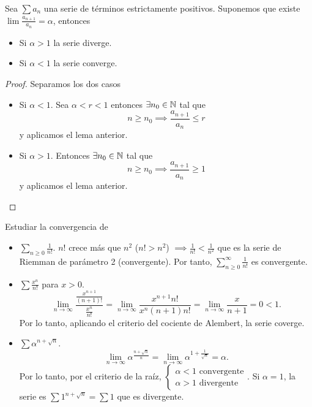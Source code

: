 \begin{prop}
    Sea $\sum a_n$ una serie de términos estrictamente positivos. Suponemos que existe
    $\lim \frac{a_{n+1}}{a_n} = \alpha$, entonces
    \begin{itemize}
        \item Si $\alpha > 1$ la serie diverge.
        \item Si $\alpha < 1$ la serie converge.
    \end{itemize}
\end{prop}

\begin{proof}
    Separamos los dos casos
    \begin{itemize}
        \item Si $\alpha < 1$. Sea $\alpha < r < 1$ entonces $\exists n_0 \in \mathbb{N}$
        tal que
        \[
            n \geq n_0 \implies \frac{a_{n+1}}{a_n} \leq r
        \]
        y aplicamos el lema anterior.
        \item Si $\alpha > 1$. Entonces  $\exists n_0 \in \mathbb{N}$ tal que
        \[
            n \geq n_0 \implies \frac{a_{n+1}}{a_n} \geq 1
        \]
        y aplicamos el lema anterior.
    \end{itemize}
\end{proof}

\begin{example*}
    Estudiar la convergencia de
    \begin{itemize}
        \item $\sum\limits_{n \geq 0} \frac{1}{n!}$.
            $n!$ crece más que    $n^2$ ($n! > n^2$) $\implies \frac{1}{n!} < \frac{1}{n^2}$
            que es la serie de Riemman de parámetro 2 (convergente). Por tanto,
            $\sum\limits_{n \geq 0}^\infty \frac{1}{n!}$ es convergente.
        \item $\sum \frac{x^n}{n!}$ para $x > 0$.
            \[
                \lim_{n \to \infty} \frac{\frac{x^{n+1}}{(n+1)!}}{\frac{x^n}{n!}} =
                \lim_{n \to \infty} \frac{x^{n+1}n!}{x^n(n+1)n!} = \lim_{n \to \infty}
                \frac{x}{n+1} = 0 < 1.
            \]
            Por lo tanto, aplicando el criterio del cociente de Alembert, la serie coverge.
        \item $\sum \alpha^{n+\sqrt{n}}$.
            \[
                \lim_{n \to \infty} \alpha^{\frac{n + \sqrt{n}}{n}} =
                \lim_{n \to \infty} \alpha^{1 + \frac{1}{\sqrt{n}}} = \alpha.
            \]
            Por lo tanto, por el criterio de la raíz, $\begin{cases} \alpha < 1
            \text{ convergente} \\ \alpha > 1 \text{ divergente}\end{cases}$. Si $\alpha =1$,
            la serie es $\sum 1^{n + \sqrt{n}} = \sum 1$ que es divergente.
    \end{itemize}
\end{example*}

